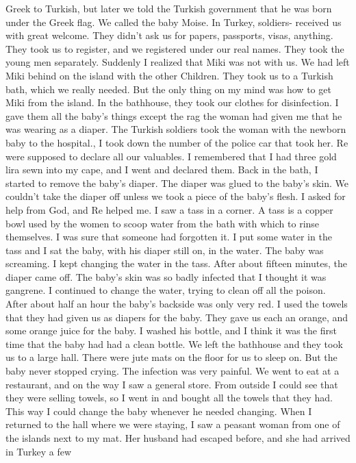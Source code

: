 Greek to Turkish, but later we told the Turkish government that he was 
born under the Greek flag. We called the baby Moise. In Turkey, soldiers-
received us with great welcome. They didn't ask us for papers, passports, 
visas, anything. They took us to register, and we registered under our 
real names. They took the young men separately. Suddenly I realized that 
Miki was not with us. We had left Miki behind on the island with the other 
Children. They took us to a Turkish bath, which we really needed. But the only 
thing on my mind was how to get Miki from the island. In the bathhouse,  
they took our clothes for disinfection. I gave them all the baby's things 
except the rag the woman had given me that he was wearing as a diaper. 
The Turkish soldiers took the woman with the newborn baby to the hospital., 
I took down the number of the police car that took her. 
Re were supposed to declare all our valuables. I remembered that I 
had three gold lira sewn into my cape, and I went and declared them. Back 
in the bath, I started to remove the baby's diaper. The diaper was glued 
to the baby's skin. We couldn't take the diaper off unless we took a piece of the baby’s flesh.  
I asked for help from God, and Re helped me. I saw a tass in a corner. A tass is a copper bowl used by the women to scoop water from the bath with which to rinse themselves. I was sure that someone had forgotten it. I put some water in the tass and I sat the baby, 
with his diaper still on, in the water. The baby was screaming. I kept 
changing the water in the tass. After about fifteen minutes, the diaper 
came off. The baby's skin was so badly infected that I thought it was 
gangrene. I continued to change the water, trying to clean off all the 
poison. After about half an hour the baby's backside was only very red. 
I used the towels that they had given us as diapers for the baby. They 
gave us each an orange, and some orange juice for the baby. I washed 
his bottle, and I think it was the first time that the baby had had 
a clean bottle. We left the bathhouse and they took us to a large hall. 
There were jute mats on the floor for us to sleep on. But the baby never 
stopped crying. The infection was very painful. 
We went to eat at a restaurant, and on the way I saw a general store. 
From outside I could see that they were selling towels, so I went in and 
bought all the towels that they had. This way I could change the baby 
whenever he needed changing. When I returned to the hall where we 
were staying, I saw a peasant woman from one of the islands next to my 
mat. Her husband had escaped before, and she had arrived in Turkey a few 
